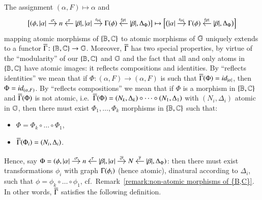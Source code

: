 The assignment $(\alpha,F) \mapsto \alpha$ and 
\[
\bigl[(\phi,
\begin{tikzcd}[cramped,sep=small]
\length\alpha \ar[r,"\sigma"] & n & \length\beta \ar[l,"\tau"']
\end{tikzcd},
\begin{tikzcd}[cramped,sep=small]
\length\alpha \ar[r,"\injP{\length\alpha}"] & \ggraph\phi & \length\beta \ar[l,"\injP{\length\beta}"']
\end{tikzcd},
\Delta_\Phi
)\bigr] 
\mapsto \Bigl[\bigl(
\begin{tikzcd}[cramped,sep=small]
\length\alpha \ar[r,"\injP{\length\alpha}"] & \ggraph\phi & \length\beta \ar[l,"\injP{\length\beta}"']
\end{tikzcd}, \Delta_\Phi \bigr)\Bigr]
\]
mapping atomic morphisms of $\{ \mathbb B,\mathbb C\}$ to atomic morphisms of $\mathbb G$ uniquely extends to a functor $\overline{\Gamma} \colon \{ \mathbb B,\mathbb C\} \to \mathbb G$. Moreover, $\overline{\Gamma}$ has two special properties, by virtue of the ``modularity'' of our $\{ \mathbb B,\mathbb C\}$ and $\mathbb G$ and the fact that all and only atoms in $\{ \mathbb B,\mathbb C\}$ have atomic images: it reflects compositions and identities. By ``reflects identities'' we mean that if $\Phi \colon (\alpha,F) \to (\alpha,F)$ is such that $\overline{\Gamma}(\Phi)=\mathop{\textit{id}_{\lvert \alpha \rvert}}$, then $\Phi=\mathop{\textit{id}_{(\alpha,F)}}$. By ``reflects compositions'' we mean that if $\Phi$ is a morphism in $\{ \mathbb B,\mathbb C\}$ and $\overline{\Gamma}(\Phi)$ is not atomic, i.e.\ $\overline{\Gamma}(\Phi) = (N_k,\Delta_k) \circ \dots \circ (N_1,\Delta_1)$ with $(N_i,\Delta_i)$ atomic in $\mathbb G$, then there must exist $\Phi_1,\dots,\Phi_k$ morphisms in $\{ \mathbb B,\mathbb C\}$ such that:
\begin{itemize}
    \item $\Phi = \Phi_k \circ \dots \circ \Phi_1$,
    \item $\overline{\Gamma}(\Phi_i) = (N_i,\Delta_i)$.
\end{itemize}
Hence, say $\Phi = 
(\phi,
\begin{tikzcd}[cramped,sep=small]
\length\alpha \ar[r,"\sigma"] & n & \length\beta \ar[l,"\tau"']
\end{tikzcd},
\begin{tikzcd}[cramped,sep=small]
\length\alpha \ar[r,"\overline\sigma"] & N & \length\beta \ar[l,"\overline\tau"']
\end{tikzcd},
\Delta_\Phi
)
$: then there must exist transformations $\phi_i$ with graph $\graph{\phi_i}$ (hence atomic), dinatural according to $\Delta_i$, such that $\phi = \phi_k \circ \dots \circ \phi_1$, cf.\ Remark~\ref{remark:non-atomic morphisms of {B,C}}. In other words, $\overline{\Gamma}$ satisfies the following definition.

